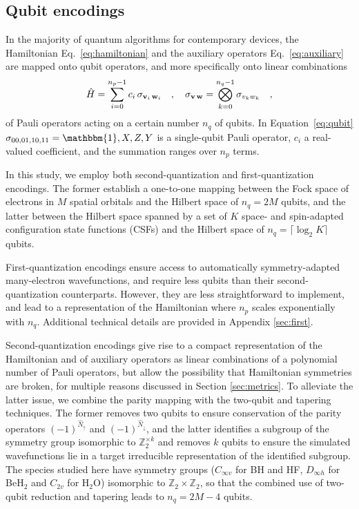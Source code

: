 \documentclass[aps,pra,onecolumn]{revtex4-2}
\newcommand{\vett}[1]{{\bf{#1}}}
\begin{document}
\subsection{Qubit encodings}

In the majority of quantum algorithms for contemporary devices, the Hamiltonian Eq.~\eqref{eq:hamiltonian} and the auxiliary operators Eq.~\eqref{eq:auxiliary} are mapped onto qubit operators,
and more specifically onto linear combinations 
\begin{equation}
\label{eq:qubit}
\hat{H} = \sum_{i=0}^{n_p-1} c_i \, \sigma_{\vett{v}_i \, \vett{w}_i} 
\quad,\quad
\sigma_{\vett{v} \, \vett{w}} = \bigotimes_{k=0}^{n_q-1} \sigma_{v_k w_k} 
\quad,
\end{equation}
of Pauli operators acting on a certain number $n_q$ of qubits. In Equation~\eqref{eq:qubit} $\sigma_{00,01,10,11} = \mathbbm{1},X,Z,Y$ is a single-qubit Pauli operator, 
$c_i$ a real-valued coefficient, and the summation ranges over $n_p$ terms.

In this study, we employ both second-quantization and first-quantization encodings.
The former establish a one-to-one mapping between the Fock space of electrons in $M$ spatial orbitals and the Hilbert space of $n_q = 2M$ qubits,
and the latter between the Hilbert space spanned by a set of $K$ space- and spin-adapted configuration state functions (CSFs) and the Hilbert space of $n_q = \lceil \log_2 K \rceil$ qubits.

First-quantization encodings ensure access to automatically symmetry-adapted many-electron wavefunctions, and require less qubits than their second-quantization counterparts.
However, they are less straightforward to implement, and lead to a representation of the Hamiltonian where $n_p$ scales exponentially with $n_q$.
Additional technical details are provided in Appendix \ref{sec:first}.

Second-quantization encodings give rise to a compact representation of the Hamiltonian and of auxiliary operators as linear combinations of a polynomial number of Pauli operators,
but allow the possibility that Hamiltonian symmetries are broken, for multiple reasons discussed in Section \ref{sec:metrics}.
To alleviate the latter issue, we combine the parity mapping with the two-qubit and tapering techniques. The former removes two qubits to ensure conservation of the parity operators
$(-1)^{\hat{N}_\uparrow}$ and $(-1)^{\hat{N}_\downarrow}$, and the latter identifies a subgroup of the symmetry group isomorphic to $\mathbb{Z}_2^{\times k}$ and removes $k$ qubits
to ensure the simulated wavefunctions lie in a target irreducible representation of the identified subgroup. The species studied here have symmetry groups 
($C_{\infty v}$ for BH and HF, $D_{\infty h}$ for BeH$_2$ and $C_{2v}$ for H$_2$O) isomorphic to $\mathbb{Z}_2 \times \mathbb{Z}_2$, so that the combined use of two-qubit reduction
and tapering leads to $n_q = 2M-4$ qubits.
\end{document}
